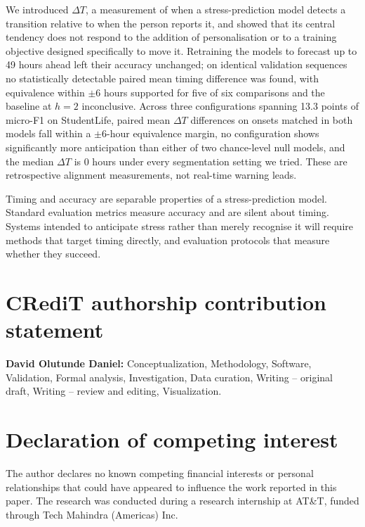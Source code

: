 \documentclass[preprint,12pt,authoryear]{elsarticle}
\newcommand{\dt}{$\Delta T$}
\begin{document}
We introduced \dt{}, a measurement of when a stress-prediction model
detects a transition relative to when the person reports it, and showed
that its central tendency does not respond to the addition of
personalisation or to a training objective designed specifically to
move it. Retraining the models to forecast up to 49 hours ahead left
their accuracy unchanged; on identical validation sequences no
statistically detectable paired mean timing difference was found, with
equivalence within $\pm 6$ hours supported for five of six comparisons
and the baseline at $h = 2$ inconclusive. Across three configurations spanning 13.3 points of
micro-F1 on StudentLife, paired mean \dt{} differences on onsets
matched in both models fall within a $\pm 6$-hour equivalence margin,
no configuration shows significantly more anticipation than either of
two chance-level null models, and the median \dt{} is 0 hours under
every segmentation setting we tried. These are retrospective alignment
measurements, not real-time warning leads.

Timing and accuracy are separable properties of a stress-prediction
model. Standard evaluation metrics measure accuracy and are silent about
timing. Systems intended to anticipate stress rather than
merely recognise it will require methods that target timing directly,
and evaluation protocols that measure whether they succeed.

\section*{CRediT authorship contribution statement}

\textbf{David Olutunde Daniel:} Conceptualization, Methodology,
Software, Validation, Formal analysis, Investigation, Data curation,
Writing -- original draft, Writing -- review and editing, Visualization.

\section*{Declaration of competing interest}

The author declares no known competing financial interests or personal
relationships that could have appeared to influence the work reported in
this paper. The research was conducted during a research internship at
AT\&T, funded through Tech Mahindra (Americas) Inc.
\end{document}
